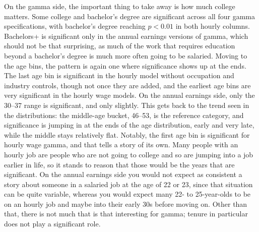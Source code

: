 \documentclass[12pt]{article}
\begin{document}
\begin{onehalfspace}
On the gamma side, the important thing to take away is how much college matters. Some college and bachelor's degree are significant across all four gamma specifications, with bachelor's degree reaching $p<0.01$ in both hourly columns. Bachelors+ is significant only in the annual earnings versions of gamma, which should not be that surprising, as much of the work that requires education beyond a bachelor's degree is much more often going to be salaried. Moving to the age bins, the pattern is again one where significance shows up at the ends. The last age bin is significant in the hourly model without occupation and industry controls, though not once they are added, and the earliest age bins are very significant in the hourly wage models. On the annual earnings side, only the 30--37 range is significant, and only slightly. This gets back to the trend seen in the distributions: the middle-age bucket, 46--53, is the reference category, and significance is jumping in at the ends of the age distribution, early and very late, while the middle stays relatively flat. Notably, the first age bin is significant for hourly wage gamma, and that tells a story of its own. Many people with an hourly job are people who are not going to college and so are jumping into a job earlier in life, so it stands to reason that those would be the years that are significant. On the annual earnings side you would not expect as consistent a story about someone in a salaried job at the age of 22 or 23, since that situation can be quite variable, whereas you would expect many 22- to 25-year-olds to be on an hourly job and maybe into their early 30s before moving on. Other than that, there is not much that is that interesting for gamma; tenure in particular does not play a significant role.


\end{onehalfspace}
\end{document}
